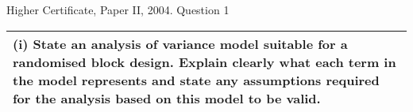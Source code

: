 \documentclass[a4paper,12pt]{article}
\begin{document}
Higher Certificate, Paper II, 2004. Question 1


\begin{table}[ht!]
 
\centering
 
\begin{tabular}{|p{15cm}|}
 
\hline  

 (i) State an analysis of variance model suitable for a randomised block design.  
Explain clearly what each term in the model represents and state any assumptions required for the analysis based on this model to be valid. 
 

\\ \hline
  
\end{tabular}

\end{table} 
\end{document}
